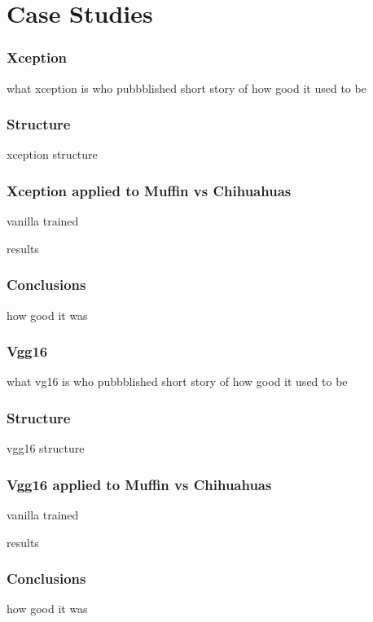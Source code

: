 \newpage
\section{Case Studies}

\subsubsection{Xception}

what xception is
who pubbblished
short story of how good it used to be

\subsubsection{Structure}
xception structure

\subsubsection{Xception applied to Muffin vs Chihuahuas}

vanilla
trained

results

\subsubsection{Conclusions}
how good it was

\subsubsection{Vgg16}

what vg16 is
who pubbblished
short story of how good it used to be

\subsubsection{Structure}
vgg16 structure

\subsubsection{Vgg16 applied to Muffin vs Chihuahuas}

vanilla
trained

results

\subsubsection{Conclusions}
how good it was

